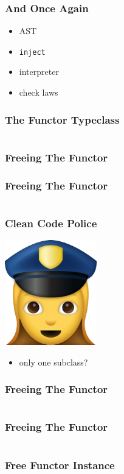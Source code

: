 \documentclass{beamer}
\newcommand{\recipe}{%
  \begin{itemize}
  \item AST
  \item \texttt{inject}
  \item interpreter
  \item check laws
  \end{itemize}
}
\begin{document}
\begin{frame}[fragile]
  \frametitle{And Once Again}
  \recipe{}
\end{frame}

\begin{frame}[fragile]
  \frametitle{The Functor Typeclass}
  \inputminted{scala}{snippets/functor-typeclass.scala}
\end{frame}

\begin{frame}[fragile]
  \frametitle{Freeing The Functor}
\end{frame}

\begin{frame}[fragile]
  \frametitle{Freeing The Functor}
  \inputminted{scala}{snippets/free-functor2.scala}
\end{frame}

\begin{frame}[fragile]
  \frametitle{Clean Code Police}
  \begin{center}
    \includegraphics[width=0.3\textwidth]{static-images/police.png}
  \end{center}
  \begin{itemize}
  \item only one subclass?
  \end{itemize}
\end{frame}

\begin{frame}[fragile]
  \frametitle{Freeing The Functor}
  \inputminted{scala}{snippets/free-functor3.scala}
\end{frame}

\begin{frame}[fragile]
  \frametitle{Freeing The Functor}
  \inputminted{scala}{snippets/free-functor4.scala}
\end{frame}

\begin{frame}[fragile]
  \frametitle{Free Functor Instance}
\end{frame}
\end{document}
